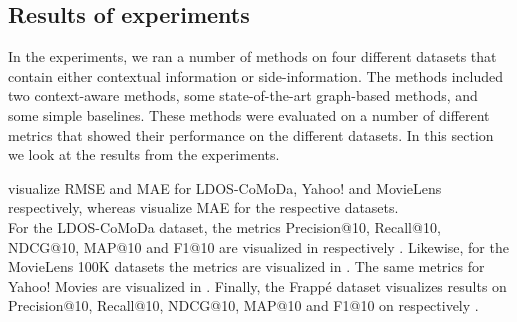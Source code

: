 \subsection{Results of experiments}\label{subsec:resultsofexperiment}
In the experiments, we ran a number of methods on four different datasets that contain either contextual information or side-information.
The methods included two context-aware methods, some state-of-the-art graph-based methods, and some simple baselines.
These methods were evaluated on a number of different metrics that showed their performance on the different datasets.
In this section we look at the results from the experiments.




 visualize RMSE and MAE for LDOS-CoMoDa, Yahoo! and MovieLens respectively, whereas  visualize MAE for the respective datasets.\\
For the LDOS-CoMoDa dataset, the metrics Precision@10, Recall@10, NDCG@10, MAP@10 and F1@10 are visualized in respectively .
Likewise, for the MovieLens 100K datasets the metrics are visualized in .
The same metrics for Yahoo! Movies are visualized in .
Finally, the Frappé dataset visualizes results on Precision@10, Recall@10, NDCG@10, MAP@10 and F1@10 on respectively .

